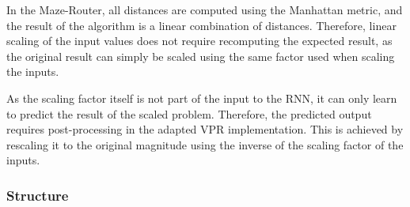 In the Maze-Router, all distances are computed using the Manhattan metric, and the result of the algorithm is a linear combination of distances. Therefore, linear scaling of the input values does not require recomputing the expected result, as the original result can simply be scaled using the same factor used when scaling the inputs.

As the scaling factor itself is not part of the input to the \gls{RNN}, it can only learn to predict the result of the scaled problem. Therefore, the predicted output requires post-processing in the adapted \gls{VPR} implementation. This is achieved by rescaling it to the original magnitude using the inverse of the scaling factor of the inputs.

\subsubsection{Structure}\label{ch:rnn-design}

